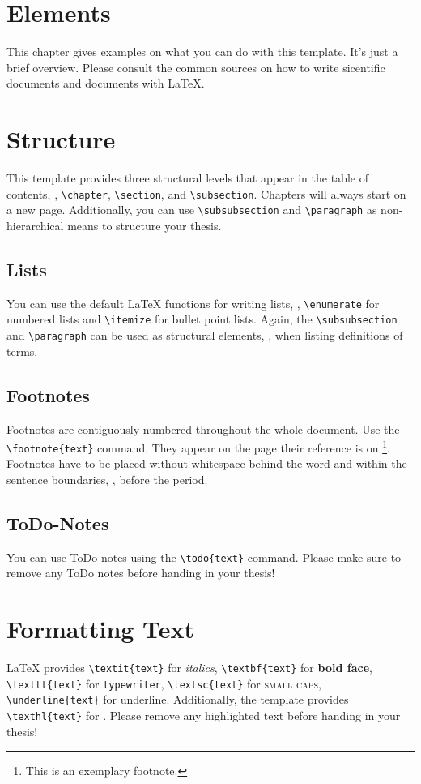 \section{Elements}
This chapter gives examples on what you can do with this template. It's just a brief overview. Please consult the common sources on how to write sicentific documents and documents with \LaTeX.

\section{Structure}
This template provides three structural levels that appear in the table of contents, \viz, \texttt{\textbackslash chapter}, \texttt{\textbackslash section}, and \texttt{\textbackslash subsection}. Chapters will always start on a new page. Additionally, you can use \texttt{\textbackslash subsubsection} and \texttt{\textbackslash paragraph} as non-hierarchical means to structure your thesis.


\subsection{Lists}
You can use the default \LaTeX \- functions for writing lists, \viz, \texttt{\textbackslash enumerate} for numbered lists and \texttt{\textbackslash itemize} for bullet point lists. Again, the \texttt{\textbackslash subsubsection} and \texttt{\textbackslash paragraph} can be used as structural elements, \eg, when listing definitions of terms.

\subsection{Footnotes}
Footnotes are contiguously numbered throughout the whole document. Use the \texttt{\textbackslash footnote\{text\}} command.  They appear on the page their reference is on \footnote{This is an exemplary footnote.}. Footnotes have to be placed without whitespace behind the word and within the sentence boundaries, \ie, before the period.

\subsection{ToDo-Notes}
You can use ToDo notes using the \texttt{\textbackslash todo\{text\}}  command. Please make sure to remove any ToDo notes before handing in your thesis! 

\section{Formatting Text}
\LaTeX \- provides \texttt{\textbackslash textit\{text\}} for \textit{italics}, \texttt{\textbackslash textbf\{text\}} for \textbf{bold face}, \texttt{\textbackslash texttt\{text\}} for \texttt{typewriter}, \texttt{\textbackslash textsc\{text\}} for \textsc{small caps}, \texttt{\textbackslash underline\{text\}} for \underline{underline}. Additionally, the template provides  \texttt{\textbackslash texthl\{text\}} for . Please remove any highlighted text before handing in your thesis!

